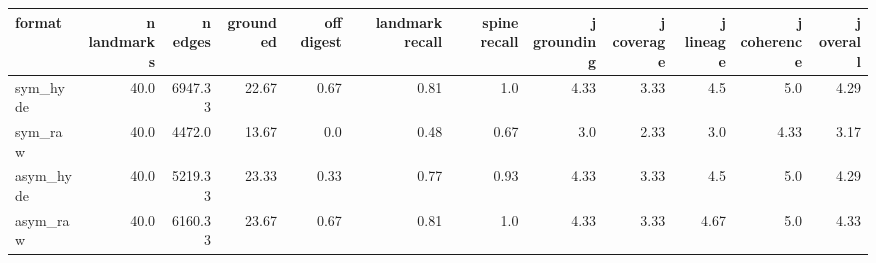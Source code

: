 \begin{tabular}{lrrrrrrrrrrr}
\toprule
format & n landmarks & n edges & grounded & off digest & landmark recall & spine recall & j grounding & j coverage & j lineage & j coherence & j overall \\
\midrule
sym\_hyde & 40.0 & 6947.33 & 22.67 & 0.67 & 0.81 & 1.0 & 4.33 & 3.33 & 4.5 & 5.0 & 4.29 \\
sym\_raw & 40.0 & 4472.0 & 13.67 & 0.0 & 0.48 & 0.67 & 3.0 & 2.33 & 3.0 & 4.33 & 3.17 \\
asym\_hyde & 40.0 & 5219.33 & 23.33 & 0.33 & 0.77 & 0.93 & 4.33 & 3.33 & 4.5 & 5.0 & 4.29 \\
asym\_raw & 40.0 & 6160.33 & 23.67 & 0.67 & 0.81 & 1.0 & 4.33 & 3.33 & 4.67 & 5.0 & 4.33 \\
\bottomrule
\end{tabular}
